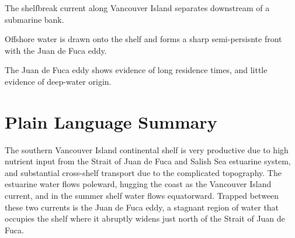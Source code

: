 \documentclass[draft]{agujournal2019}
\begin{document}

\begin{keypoints}
\item The shelfbreak current along Vancouver Island separates downstream of a submarine bank.
\item Offshore water is drawn onto the shelf and forms a sharp semi-persisnte front with the Juan de Fuca eddy.
\item The Juan de Fuca eddy shows evidence of long residence times, and little evidence of deep-water origin.
\end{keypoints}

%
%

%
%


\begin{abstract}

\end{abstract}

\section*{Plain Language Summary}

The southern Vancouver Island continental shelf is very productive due to high nutrient input from the Strait of Juan de Fuca and Salish Sea estuarine system, and substantial cross-shelf transport due to the complicated topography.  The estuarine water flows poleward, hugging the coast as the Vancouver Island current, and in the summer shelf water flows equatorward.  Trapped between these two currents is the Juan de Fuca eddy, a stagnant region of water that occupies the shelf where it abruptly widens just north of the Strait of Juan de Fuca.
\end{document}
